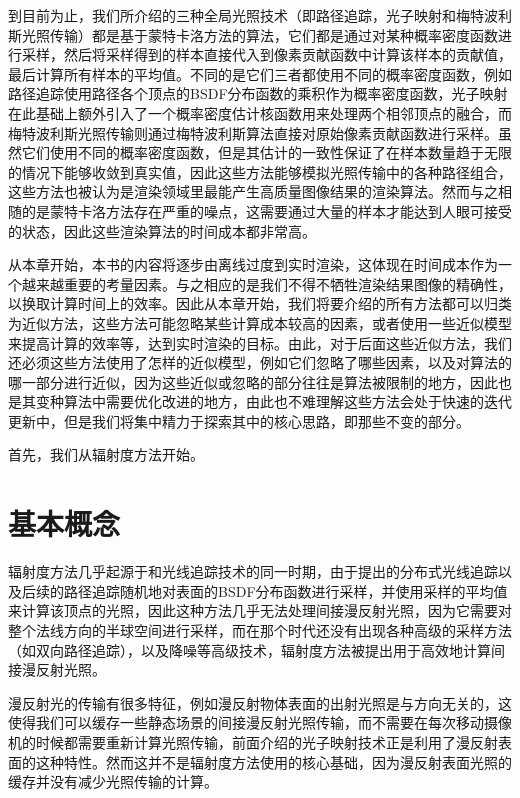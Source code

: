 到目前为止，我们所介绍的三种全局光照技术（即路径追踪，光子映射和梅特波利斯光照传输）都是基于蒙特卡洛方法的算法，它们都是通过对某种概率密度函数进行采样，然后将采样得到的样本直接代入到像素贡献函数中计算该样本的贡献值，最后计算所有样本的平均值。不同的是它们三者都使用不同的概率密度函数，例如路径追踪使用路径各个顶点的BSDF分布函数的乘积作为概率密度函数，光子映射在此基础上额外引入了一个概率密度估计核函数用来处理两个相邻顶点的融合，而梅特波利斯光照传输则通过梅特波利斯算法直接对原始像素贡献函数进行采样。虽然它们使用不同的概率密度函数，但是其估计的一致性保证了在样本数量趋于无限的情况下能够收敛到真实值，因此这些方法能够模拟光照传输中的各种路径组合，这些方法也被认为是渲染领域里最能产生高质量图像结果的渲染算法。然而与之相随的是蒙特卡洛方法存在严重的噪点，这需要通过大量的样本才能达到人眼可接受的状态，因此这些渲染算法的时间成本都非常高。

从本章开始，本书的内容将逐步由离线过度到实时渲染，这体现在时间成本作为一个越来越重要的考量因素。与之相应的是我们不得不牺牲渲染结果图像的精确性，以换取计算时间上的效率。因此从本章开始，我们将要介绍的所有方法都可以归类为近似方法，这些方法可能忽略某些计算成本较高的因素，或者使用一些近似模型来提高计算的效率等，达到实时渲染的目标。由此，对于后面这些近似方法，我们还必须这些方法使用了怎样的近似模型，例如它们忽略了哪些因素，以及对算法的哪一部分进行近似，因为这些近似或忽略的部分往往是算法被限制的地方，因此也是其变种算法中需要优化改进的地方，由此也不难理解这些方法会处于快速的迭代更新中，但是我们将集中精力于探索其中的核心思路，即那些不变的部分。

首先，我们从辐射度方法开始。





\section{基本概念}
辐射度方法几乎起源于和光线追踪技术的同一时期，由于\cite{a:DistributedRayTracing}提出的分布式光线追踪以及后续的路径追踪随机地对表面的BSDF分布函数进行采样，并使用采样的平均值来计算该顶点的光照，因此这种方法几乎无法处理间接漫反射光照，因为它需要对整个法线方向的半球空间进行采样，而在那个时代还没有出现各种高级的采样方法（如双向路径追踪），以及降噪等高级技术，辐射度方法\cite{a:ModelingtheInteractionofLightBetweenDiffuseSurfaces}被提出用于高效地计算间接漫反射光照。

漫反射光的传输有很多特征，例如漫反射物体表面的出射光照是与方向无关的，这使得我们可以缓存一些静态场景的间接漫反射光照传输，而不需要在每次移动摄像机的时候都需要重新计算光照传输，前面介绍的光子映射技术正是利用了漫反射表面的这种特性。然而这并不是辐射度方法使用的核心基础，因为漫反射表面光照的缓存并没有减少光照传输的计算。

